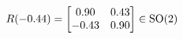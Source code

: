 \documentclass[preview]{standalone}
\begin{document}
\begin{align*}
\special{dvisvgm:raw <g id='unique000'>}R(-0.44) = \begin{bmatrix} 0.90 & 0.43 \\ -0.43 & 0.90 \end{bmatrix} \in \text{SO}(2)\special{dvisvgm:raw </g>}
\end{align*}
\end{document}
